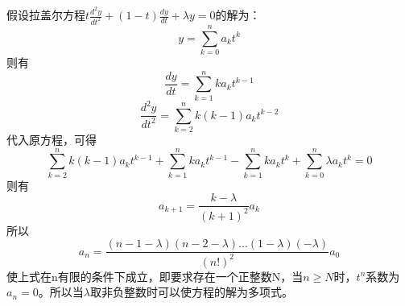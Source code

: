 \documentclass[10.5pt]{article}
\begin{document}
\section{}
假设拉盖尔方程$t\frac{d^2 y}{d t^2} + (1-t)\frac{d y}{d t} + \lambda y = 0$的解为：$$y = \sum_{k=0}^n a_kt^k$$\indent
则有$$\frac{d y}{dt} = \sum_{k=1}^n ka_k t^{k-1}$$ $$\frac{d^2 y}{dt^2} = \sum_{k=2}^n k(k-1) a_k t^{k-2}$$\indent
代入原方程，可得$$\sum_{k=2}^n k(k-1)a_k t^{k-1} + \sum_{k=1}^n ka_k t^{k-1} - \sum_{k=1}^n ka_k t^k + \sum_{k=0}^n \lambda a_k t^k = 0$$\indent
则有$$a_{k+1} = \frac{k-\lambda}{(k+1)^2}a_k$$\indent
所以$$a_n = \frac{(n-1-\lambda)(n-2-\lambda)...(1-\lambda)(-\lambda)}{\left(n!\right)^2}a_0$$\indent
使上式在n有限的条件下成立，即要求存在一个正整数N，当$n\geqslant N$时，$t^n$系数为$a_n = 0$。所以当$\lambda$取非负整数时可以使方程的解为多项式。
\end{document}
